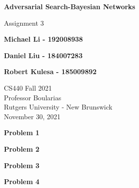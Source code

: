 \documentclass[11pt]{article}
\begin{document}
    \begin{titlepage}
        \begin{center}
            \vspace{1cm}

            \Huge
            \textbf{Adversarial Search-Bayesian Networks}

            \vspace{0.5cm}
            \LARGE
            Assignment 3

            \vspace{1cm}

            \textbf{Michael Li - 192008938}

            \textbf{Daniel Liu - 184007283}

            \textbf{Robert Kulesa - 185009892}


            \vfill


            \vspace{0.8cm}

            \Large
            CS440 Fall 2021\\
            Professor Boularias\\
            Rutgers University - New Brunswick\\
            November 30, 2021

        \end{center}
    \end{titlepage}

    \begin{center}
        \Large
        \textbf{Problem 1}
    \end{center}
    \normalsize


    \begin{center}
        \Large
        \textbf{Problem 2}
    \end{center}
    \normalsize
    \begin{enumerate}

        
    \end{enumerate}

    \begin{center}
        \Large
        \textbf{Problem 3}
    \end{center}
    \normalsize
    \begin{enumerate}

    \end{enumerate}

    \begin{center}
        \Large
        \textbf{Problem 4}
    \end{center}
    \normalsize
    \begin{enumerate}

    \end{enumerate}


    
\end{document}
